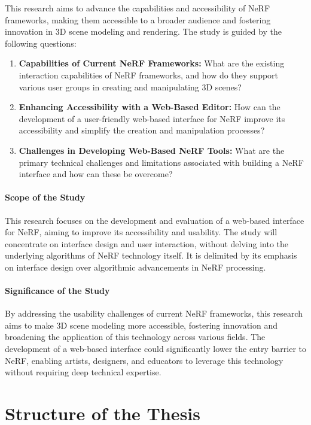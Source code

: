 This research aims to advance the capabilities and accessibility of NeRF frameworks, making them accessible to a broader audience and fostering innovation in 3D scene modeling and rendering. The study is guided by the following questions:

\begin{enumerate}
    \item \textbf{Capabilities of Current NeRF Frameworks:} What are the existing interaction capabilities of NeRF frameworks, and how do they support various user groups in creating and manipulating 3D scenes?

    \item \textbf{Enhancing Accessibility with a Web-Based Editor:} How can the development of a user-friendly web-based interface for NeRF improve its accessibility and simplify the creation and manipulation processes?

    \item \textbf{Challenges in Developing Web-Based NeRF Tools:} What are the primary technical challenges and limitations associated with building a NeRF interface and how can these be overcome?
\end{enumerate}

\paragraph{Scope of the Study}
This research focuses on the development and evaluation of a web-based interface for NeRF, aiming to improve its accessibility and usability. 
The study will concentrate on interface design and user interaction, without delving into the underlying algorithms of NeRF technology itself. 
It is delimited by its emphasis on interface design over algorithmic advancements in NeRF processing.

\paragraph{Significance of the Study}
By addressing the usability challenges of current NeRF frameworks, this research aims to make 3D scene modeling more accessible, fostering innovation and broadening the application of this technology across various fields. 
The development of a web-based interface could significantly lower the entry barrier to NeRF, enabling artists, designers, and educators to leverage this technology without requiring deep technical expertise.

\section{Structure of the Thesis}
\label{sec:intro:structure}

